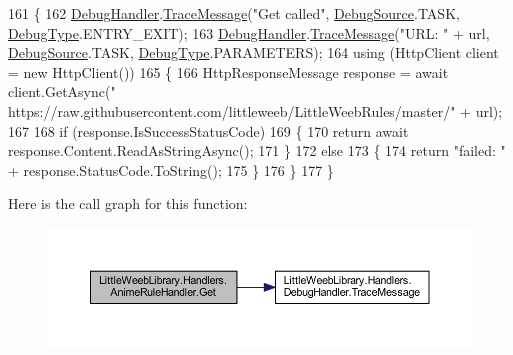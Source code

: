\begin{DoxyCode}
161         \{
162             \mbox{\hyperlink{class_little_weeb_library_1_1_handlers_1_1_anime_rule_handler_a6ad89134d97d818f3b2deebb7e2cf361}{DebugHandler}}.\mbox{\hyperlink{interface_little_weeb_library_1_1_handlers_1_1_i_debug_handler_a2e405bc3492e683cd3702fae125221bc}{TraceMessage}}(\textcolor{stringliteral}{"Get called"}, 
      \mbox{\hyperlink{namespace_little_weeb_library_1_1_handlers_a2a6ca0775121c9c503d58aa254d292be}{DebugSource}}.TASK, \mbox{\hyperlink{namespace_little_weeb_library_1_1_handlers_ab66019ed40462876ec4e61bb3ccb0a62}{DebugType}}.ENTRY\_EXIT);
163             \mbox{\hyperlink{class_little_weeb_library_1_1_handlers_1_1_anime_rule_handler_a6ad89134d97d818f3b2deebb7e2cf361}{DebugHandler}}.\mbox{\hyperlink{interface_little_weeb_library_1_1_handlers_1_1_i_debug_handler_a2e405bc3492e683cd3702fae125221bc}{TraceMessage}}(\textcolor{stringliteral}{"URL: "} + url, 
      \mbox{\hyperlink{namespace_little_weeb_library_1_1_handlers_a2a6ca0775121c9c503d58aa254d292be}{DebugSource}}.TASK, \mbox{\hyperlink{namespace_little_weeb_library_1_1_handlers_ab66019ed40462876ec4e61bb3ccb0a62}{DebugType}}.PARAMETERS);
164             \textcolor{keyword}{using} (HttpClient client = \textcolor{keyword}{new} HttpClient())
165             \{
166                 HttpResponseMessage response = await client.GetAsync(\textcolor{stringliteral}{"
      https://raw.githubusercontent.com/littleweeb/LittleWeebRules/master/"} + url);
167 
168                 \textcolor{keywordflow}{if} (response.IsSuccessStatusCode)
169                 \{
170                     \textcolor{keywordflow}{return} await response.Content.ReadAsStringAsync();
171                 \}
172                 \textcolor{keywordflow}{else}
173                 \{
174                     \textcolor{keywordflow}{return} \textcolor{stringliteral}{"failed: "} + response.StatusCode.ToString();
175                 \}
176             \}
177         \}
\end{DoxyCode}
Here is the call graph for this function\+:\nopagebreak
\begin{figure}[H]
\begin{center}
\leavevmode
\includegraphics[width=350pt]{class_little_weeb_library_1_1_handlers_1_1_anime_rule_handler_a721f5c5ac798ca7e81286b3f401921fb_cgraph}
\end{center}
\end{figure}


